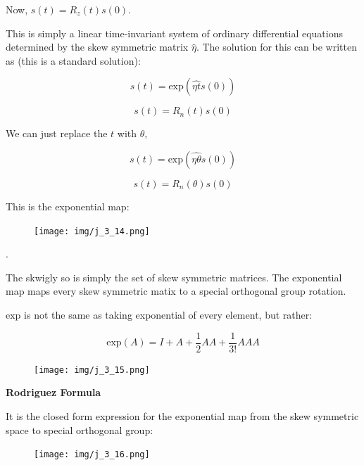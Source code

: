 Now, $s(t) = R_z(t)s(0)$.

This is simply a linear time-invariant system of ordinary differential equations determined by the skew symmetric matrix $\hat{\eta}$. The solution for this can be written as (this is a standard solution):

\begin{equation*}
    s(t) = \text{exp}(\hat{\eta t}s(0))
\end{equation*}

\begin{equation*}
    s(t) = R_n(t)s(0)
\end{equation*}

We can just replace the $t$ with $\theta$,

\begin{equation*}
    s(t) = \text{exp}(\hat{\eta \theta}s(0))
\end{equation*}

\begin{equation*}
    s(t) = R_n(\theta)s(0)
\end{equation*}

This is the exponential map:

\begin{figure}[h]\centering\texttt{[image: img/j\_3\_14.png]}\end{figure}

.

The skwigly so is simply the set of skew symmetric matrices. The exponential map maps every skew symmetric matix to a special orthogonal group rotation.

$\text{exp}$ is not the same as taking exponential of every element, but rather:

\begin{equation*}
    \text{exp}(A) = I + A + \frac{1}{2}AA + \frac{1}{3!}AAA
\end{equation*}

\begin{figure}[h]\centering\texttt{[image: img/j\_3\_15.png]}\end{figure}

\textbf{Rodriguez Formula}

It is the closed form expression for the exponential map from the skew symmetric space to special orthogonal group:

\begin{figure}[h]\centering\texttt{[image: img/j\_3\_16.png]}\end{figure}

